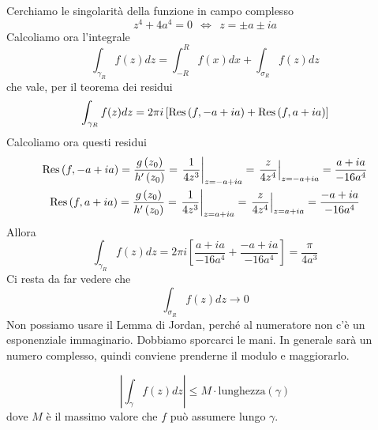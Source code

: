 \begin{figure}[htpb]
\end{figure}
\FloatBarrier

Cerchiamo le singolarità della funzione in campo complesso
\begin{equation*}
z^{4} + 4a^{4} = 0\ \ \iff \ \ z = \pm a\pm ia
\end{equation*}
Calcoliamo ora l'integrale
\begin{equation*}
\int_{\gamma_{R}} f(z) dz = \int^{R}_{- R} f(x) dx + \int_{\sigma_{R}} f(z) dz
\end{equation*}
che vale, per il teorema dei residui
\begin{equation*}
\int_{\gamma_{R}} f(z) dz = 2\pi i\left[\operatorname{Res} \left(f, - a + ia\right) + \operatorname{Res} \left(f, a + ia\right)\right]
\end{equation*}
Calcoliamo ora questi residui
\begin{gather*}
\operatorname{Res} \left(f, - a + ia\right) = \frac{g\left(z_{0}\right)}{h'\left(z_{0}\right)} = \left. \frac{1}{4z^{3}}\right|_{z = -a + ia} = \left. \frac{z}{4z^{4}}\right|_{z = -a + ia} = \frac{a + ia}{- 16a^{4}}\\
\operatorname{Res} \left(f, a + ia\right) = \frac{g\left(z_{0}\right)}{h'\left(z_{0}\right)} = \left. \frac{1}{4z^{3}}\right|_{z = a + ia} = \left. \frac{z}{4z^{4}}\right|_{z = a + ia} = \frac{- a + ia}{- 16a^{4}}
\end{gather*}
Allora
\begin{equation*}
\int_{\gamma_{R}} f(z) dz = 2\pi i\left[\frac{a + ia}{- 16a^{4}} + \frac{- a + ia}{- 16a^{4}}\right] = \frac{\pi}{4a^{3}}
\end{equation*}
Ci resta da far vedere che
\begin{equation*}
\int_{\sigma_{R}} f(z) dz\rightarrow 0
\end{equation*}
Non possiamo usare il Lemma di Jordan, perché al numeratore non c'è un esponenziale immaginario. Dobbiamo sporcarci le mani. In generale sarà un numero complesso, quindi conviene prenderne il modulo e maggiorarlo.
\begin{rem}
\begin{equation*}
\left| \int_{\gamma} f(z) dz\right| \leq M \cdot \text{lunghezza}\left(\gamma \right)
\end{equation*}
dove $M$ è il massimo valore che $f$ può assumere lungo $\gamma $.
\end{rem}
